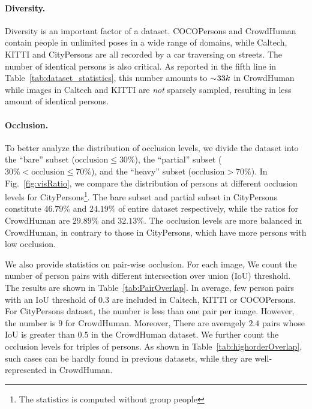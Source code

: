 \documentclass[10pt,twocolumn,letterpaper]{article}
\begin{document}
\paragraph{Diversity.}
Diversity is an important factor of a dataset. COCOPersons and CrowdHuman contain people in unlimited poses in a wide range of domains, while Caltech, KITTI and CityPersons are all recorded by a car traversing on streets. 
The number of identical persons is also critical. As reported in the fifth line in Table~\ref{tab:dataset_statistics}, this number amounts to $\sim\negmedspace 33k$ in CrowdHuman while images in Caltech and KITTI are \emph{not} sparsely sampled, resulting in less amount of identical persons.

\paragraph{Occlusion.}
To better analyze the distribution of occlusion levels, we divide the dataset into the ``bare'' subset ($\mathrm{occlusion} \leq 30\%$), the ``partial'' subset ($30\% < \mathrm{occlusion }\leq 70\%$), and the ``heavy'' subset ($\mathrm{occlusion} > 70\%$). In Fig.~\ref{fig:visRatio}, we compare the distribution of persons at different occlusion levels for CityPersons\footnote{The statistics is computed without group people}. The bare subset and partial subset in CityPersons constitute $46.79\%$ and $24.19\%$ of entire dataset respectively, while the ratios for CrowdHuman are $29.89\%$ and $32.13\%$. The occlusion levels are more balanced in CrowdHuman, in contrary to those in CityPersons, which have more persons with low occlusion.

We also provide statistics on pair-wise occlusion. For each image, We count the number of person pairs with different intersection over union (IoU) threshold. The results are shown in Table~\ref{tab:PairOverlap}. In average, few person pairs with an IoU threshold of $0.3$ are included in Caltech, KITTI or COCOPersons. For CityPersons dataset, the number is less than one pair per image. However, the number is $9$ for CrowdHuman. Moreover, There are averagely $2.4$ pairs whose IoU is greater than $0.5$ in the CrowdHuman dataset. We further count the occlusion levels for triples of persons. As shown in Table~\ref{tab:highorderOverlap}, such cases can be hardly found in previous datasets, while they are well-represented in CrowdHuman.
\end{document}
